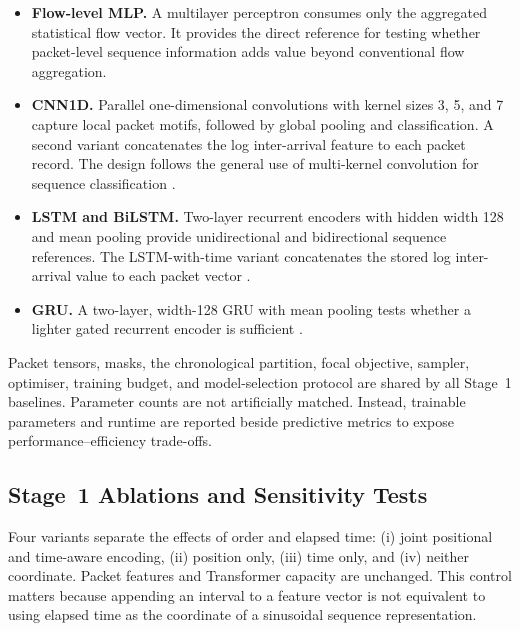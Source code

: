 \documentclass[11pt,fleqn]{report}
\begin{document}
\begin{itemize}[leftmargin=*]
    \item \textbf{Flow-level MLP.} A multilayer perceptron consumes only the aggregated statistical flow vector. It provides the direct reference for testing whether packet-level sequence information adds value beyond conventional flow aggregation.

    \item \textbf{CNN1D.} Parallel one-dimensional convolutions with kernel sizes 3, 5, and 7 capture local packet motifs, followed by global pooling and classification. A second variant concatenates the log inter-arrival feature to each packet record. The design follows the general use of multi-kernel convolution for sequence classification \cite{Kim2014CNN}.

    \item \textbf{LSTM and BiLSTM.} Two-layer recurrent encoders with hidden width 128 and mean pooling provide unidirectional and bidirectional sequence references. The LSTM-with-time variant concatenates the stored log inter-arrival value to each packet vector
    \cite{Hochreiter1997LSTM}.

    \item \textbf{GRU.} A two-layer, width-128 GRU with mean pooling tests whether a lighter gated recurrent encoder is sufficient \cite{Cho2014GRU}.

\end{itemize}

Packet tensors, masks, the chronological partition, focal objective, sampler, optimiser, training budget, and model-selection protocol are shared by all Stage~1 baselines. Parameter counts are not artificially matched. Instead, trainable parameters and runtime are reported beside predictive metrics to expose performance--efficiency trade-offs.

\subsection{Stage~1 Ablations and Sensitivity Tests}
\label{subsubsec:stage1_ablation_protocol}

Four variants separate the effects of order and elapsed time: (i) joint positional and time-aware encoding, (ii) position only, (iii) time only, and (iv) neither coordinate. Packet features and Transformer capacity are unchanged. This control matters because appending an interval to a feature vector is not equivalent to using elapsed time as the coordinate of a sinusoidal sequence representation.
\end{document}

